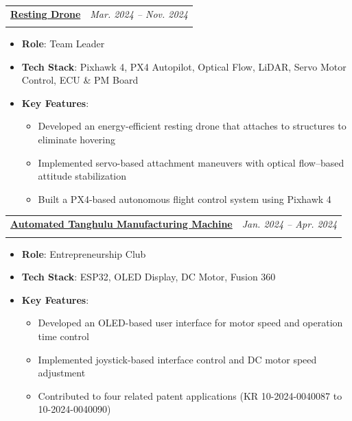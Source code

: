 \documentclass[a4paper,11pt]{article}
\makeatletter
\newcommand{\resumeProject}[4]{%
\item
    \begin{tabularx}{0.98\textwidth}[t]{@{}X>{\raggedleft\arraybackslash}p{4.1cm}@{}}
        \textbf{#1} & \textit{\footnotesize{#3}} \\
        \footnotesize{\textit{#2}} \if\relax\detokenize{#4}\relax\else\newline\footnotesize{#4}\fi &
    \end{tabularx}
}
\newcommand{\resumeItemListStart}{\begin{itemize}}
\newcommand{\resumeItemListEnd}{\end{itemize}}
\makeatother
\begin{document}
\resumeProject
{\href{https://www.youtube.com/watch?v=_1o2Oad9vVQ}{Resting Drone}}
{}
{Mar. 2024 -- Nov. 2024}
{}
\vspace{-1.5em}
\resumeItemListStart
  \item \textbf{Role}: Team Leader
  \item \textbf{Tech Stack}: Pixhawk 4, PX4 Autopilot, Optical Flow, LiDAR, Servo Motor Control, ECU \& PM Board
  \item \textbf{Key Features}:
  \begin{itemize}[leftmargin=1.2em]
    \item Developed an energy-efficient resting drone that attaches to structures to eliminate hovering
    \item Implemented servo-based attachment maneuvers with optical flow--based attitude stabilization
    \item Built a PX4-based autonomous flight control system using Pixhawk 4
  \end{itemize}
\resumeItemListEnd

\vspace{0.5em}

\newpage
\resumeProject
{\href{https://youtu.be/RuwLuphqz50}{Automated Tanghulu Manufacturing Machine}}
{}
{Jan. 2024 -- Apr. 2024}
{}
\vspace{-1.5em}
\resumeItemListStart
  \item \textbf{Role}: Entrepreneurship Club
  \item \textbf{Tech Stack}: ESP32, OLED Display, DC Motor, Fusion 360
  \item \textbf{Key Features}:
  \begin{itemize}[leftmargin=1.2em]
    \item Developed an OLED-based user interface for motor speed and operation time control
    \item Implemented joystick-based interface control and DC motor speed adjustment
    \item Contributed to four related patent applications (KR 10-2024-0040087 to 10-2024-0040090)
  \end{itemize}
\resumeItemListEnd

\vspace{0.5em}
\end{document}
